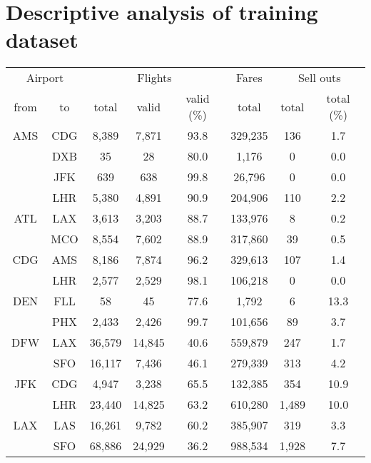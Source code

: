 \chapter{Descriptive analysis of training dataset}
\label{app:DescAnalysisTraining}


\begin{table}[h]
\centering
\begin{tabular}{c c | c c c | c | c c}
\toprule
\multicolumn{2}{c|}{Airport}  & \multicolumn{3}{c|}{Flights} & Fares & \multicolumn{2}{c}{Sell outs} \\[.4ex]
from &  to  & total  & valid  & valid (\%)  &  total  &  total  &  total (\%) \\
\midrule
AMS  &  CDG  &   8,389  &   7,871  &  93.8  &  329,235  &    136  &   1.7 \\
~    &  DXB  &      35  &      28  &  80.0  &    1,176  &      0  &   0.0 \\
~    &  JFK  &     639  &     638  &  99.8  &   26,796  &      0  &   0.0 \\
~    &  LHR  &   5,380  &   4,891  &  90.9  &  204,906  &    110  &   2.2 \\[.5ex]
ATL  &  LAX  &   3,613  &   3,203  &  88.7  &  133,976  &      8  &   0.2 \\
~    &  MCO  &   8,554  &   7,602  &  88.9  &  317,860  &     39  &   0.5 \\[.5ex]
CDG  &  AMS  &   8,186  &   7,874  &  96.2  &  329,613  &    107  &   1.4 \\
~    &  LHR  &   2,577  &   2,529  &  98.1  &  106,218  &      0  &   0.0 \\[.5ex]
DEN  &  FLL  &      58  &      45  &  77.6  &    1,792  &      6  &  13.3 \\
~    &  PHX  &   2,433  &   2,426  &  99.7  &  101,656  &     89  &   3.7 \\[.5ex]
DFW  &  LAX  &  36,579  &  14,845  &  40.6  &  559,879  &    247  &   1.7 \\
~    &  SFO  &  16,117  &   7,436  &  46.1  &  279,339  &    313  &   4.2 \\[.5ex]
JFK  &  CDG  &   4,947  &   3,238  &  65.5  &  132,385  &    354  &  10.9 \\
~    &  LHR  &  23,440  &  14,825  &  63.2  &  610,280  &  1,489  &  10.0 \\[.5ex]
LAX  &  LAS  &  16,261  &   9,782  &  60.2  &  385,907  &    319  &   3.3 \\
~    &  SFO  &  68,886  &  24,929  &  36.2  &  988,534  &  1,928  &   7.7 \\[.5ex]

\end{tabular}
\end{table}
